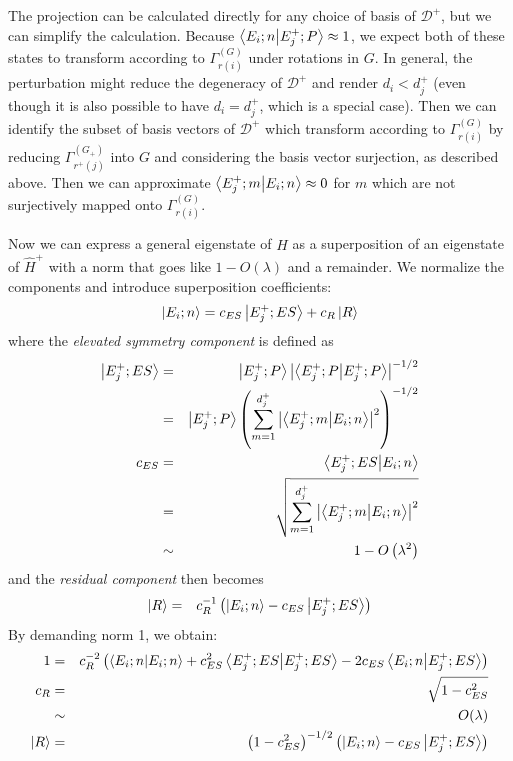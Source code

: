 \documentclass[12pt]{article}
\begin{document}
	The projection can be calculated directly for any choice of basis of $\mathcal{D}^+$, but we can simplify the calculation. Because $\braket{E_i;n}{E^+_j;P}\approx 1$, we expect both of these states to transform according to $\Gamma^{(G)}_{r(i)}$ under rotations in $G$. In general, the perturbation might reduce the degeneracy of $\mathcal{D}^+$ and render $d_i<d^+_j$ (even though it is also possible to have $d_i=d^+_j$, which is a special case). Then we can identify the subset of basis vectors of $\mathcal{D}^+$ which transform according to 	$\Gamma^{(G)}_{r(i)}$ by reducing $\Gamma^{(G_+)}_{r^+(j)}$ into $G$ and considering the basis vector surjection, as described above. Then we can approximate $\braket{E^+_j;m}{E_i;n}\approx 0$ for $m$ which are not surjectively mapped onto $\Gamma^{(G)}_{r(i)}$.
	
	Now we can express a general eigenstate of $\hat{H}$ as a superposition of an eigenstate of $\hat{H}^+$ with a norm that goes like $1-O(\lambda)$ and a remainder. We normalize the components and introduce superposition coefficients:
	$$\ket{E_i;n}=c_{ES}\ket{E^+_j;ES}+c_R\ket{R}$$
	where the \textit{elevated symmetry component} is defined as
	\begin{eqnarray*}
	\ket{E^+_j;ES}&=&\ket{E^+_j;P}\abs{\braket{E^+_j;P}{E^+_j;P}}^{-1/2}\\
	&=&\ket{E^+_j;P}\left(\sum_{m=1}^{d^+_j}\abs{\braket{E^+_j;m}{E_i;n}}^2\right)^{-1/2}\\
	c_{ES}&=&\braket{E^+_j;ES}{E_i;n}\\
	&=&\sqrt{\sum_{m=1}^{d^+_j}\abs{\braket{E^+_j;m}{E_i;n}}^2}\\
	&\sim& 1-O\left(\lambda^2\right)
	\end{eqnarray*}
	and the \textit{residual component} then becomes
	\begin{eqnarray*}
	\ket{R}&=&c_R^{-1}\left(\ket{E_i;n}-c_{ES}\ket{E^+_j;ES}\right)
	\end{eqnarray*}
	By demanding norm 1, we obtain:
	\begin{eqnarray*}
	1&=&c_R^{-2}\left(\braket{E_i;n}{E_i;n}+c_{ES}^2\braket{E^+_j;ES}{E^+_j;ES}-2c_{ES}\braket{E_i;n}{E^+_j;ES}\right)\\
	c_R&=&\sqrt{1-c_{ES}^2}\\
	&\sim & O(\lambda)\\
	\ket{R}&=& \left(1-c_{ES}^2\right)^{-1/2}\left(\ket{E_i;n}-c_{ES}\ket{E^+_j;ES}\right)
	\end{eqnarray*}
	
\end{document}
